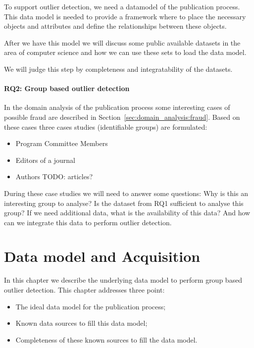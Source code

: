 \documentclass{ou-report}
\newcommand{\todo}[1]{{\color{red} TODO: #1}}
\begin{document}
To support outlier detection, we need a datamodel of the publication process. This 
data model is needed to provide a framework where to place the necessary objects and 
attributes and define the relationships between these objects.

After we have this model we will discuss some public available datasets in the area 
of computer science and how we can use these sets to load the data model. 

We will judge this step by completeness and integratability of the datasets.


\subsubsection*{RQ2: Group based outlier detection}
In the domain analysis of the publication process some interesting cases of possible
fraud are described in Section~\ref{sec:domain_analysis:fraud}. Based on these cases
three cases studies (identifiable groups) are formulated:
\begin{itemize}
    \item Program Committee Members
    \item Editors of a journal
    \item Authors \todo{articles?}
\end{itemize}
During these case studies we will need to answer some questions:
Why is this an interesting group to analyse?
Is the dataset from RQ1 sufficient to analyse this group?
If we need additional data, what is the availability of this data?
And how can we integrate this data to perform outlier detection.


\chapter{Data model and Acquisition}
\label{chp:data}
In this chapter we describe the underlying data model to perform group based 
outlier detection. This chapter addresses three point:
\begin{itemize}
    \item The ideal data model for the publication process;
    \item Known data sources to fill this data model;
    \item Completeness of these known sources to fill the data model.
\end{itemize}
\end{document}
